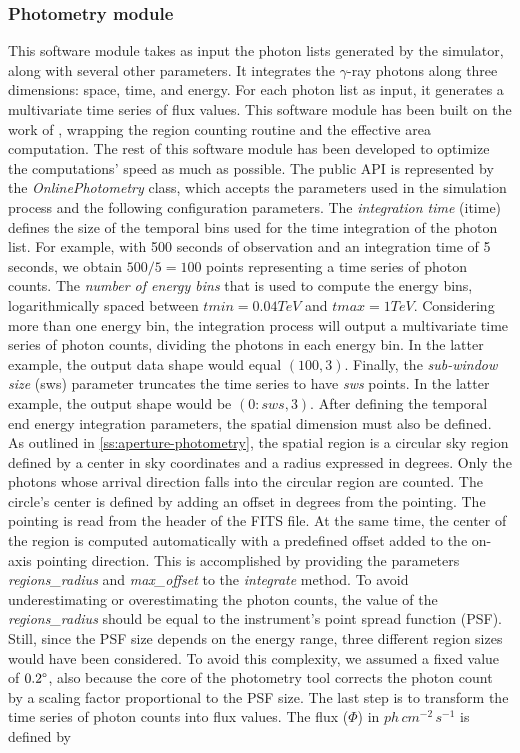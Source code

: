 \subsubsection{Photometry module}
\label{ss:photometry-module}
This software module takes as input the photon lists generated by the simulator, along with several other parameters. It integrates the $\gamma$-ray photons along three dimensions: space, time, and energy. For each photon list as input, it generates a multivariate time series of flux values. This software module has been built on the work of \cite{tampieri2020real}, wrapping the region counting routine and the effective area computation. The rest of this software module has been developed to optimize the computations' speed as much as possible. 
The public API is represented by the \textit{OnlinePhotometry} class, which accepts the parameters used in the simulation process and the following configuration parameters. The \textit{integration time} (itime) defines the size of the temporal bins used for the time integration of the photon list. For example, with 500 seconds of observation and an integration time of 5 seconds, we obtain $500/5=100$ points representing a time series of photon counts. The \textit{number of energy bins} that is used to compute the energy bins, logarithmically spaced between $tmin=0.04 TeV$ and $tmax=1 TeV$. Considering more than one energy bin, the integration process will output a multivariate time series of photon counts, dividing the photons in each energy bin. In the latter example, the output data shape would equal $(100,3)$. Finally, the \textit{sub-window size} (sws) parameter truncates the time series to have \textit{sws} points. In the latter example, the output shape would be $(0:sws, 3)$. After defining the temporal end energy integration parameters, the spatial dimension must also be defined. As outlined in \autoref{ss:aperture-photometry}, the spatial region is a circular sky region defined by a center in sky coordinates and a radius expressed in degrees. Only the photons whose arrival direction falls into the circular region are counted. The circle's center is defined by adding an offset in degrees from the pointing. The pointing is read from the header of the FITS file. At the same time, the center of the region is computed automatically with a predefined offset added to the on-axis pointing direction. This is accomplished by providing the parameters \textit{regions\_radius} and \textit{max\_offset} to the \textit{integrate} method. To avoid underestimating or overestimating the photon counts, the value of the \textit{regions\_radius} should be equal to the instrument's point spread function (PSF). Still, since the PSF size depends on the energy range, three different region sizes would have been considered. To avoid this complexity, we assumed a fixed value of $0.2\degree$, also because the core of the photometry tool \cite{tampieri2020real} corrects the photon count by a scaling factor proportional to the PSF size. The last step is to transform the time series of photon counts into flux values. The flux ($\Phi$) in $ph\,cm^{-2}\,s^{-1}$ is defined by
